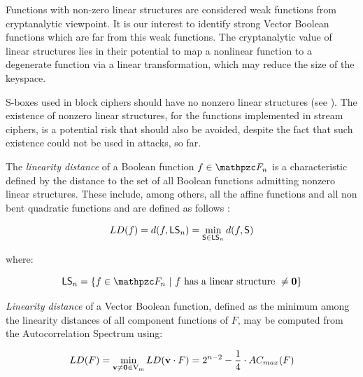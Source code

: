 Functions with non-zero linear structures are considered weak functions from cryptanalytic viewpoint. It is our interest to identify strong Vector Boolean functions which are far from this weak functions. The cryptanalytic value of linear structures lies in their potential to map a nonlinear function to a degenerate function via a linear transformation, which may reduce the size of the keyspace.

S-boxes used in block ciphers should have no nonzero linear structures (see \cite{Evertse:88}). The existence of nonzero linear structures, for the functions implemented in stream ciphers, is a potential risk that should also be avoided, despite the fact that such existence could not be used in attacks, so far.

\begin{definition}
The \textit{linearity distance} of a Boolean function $f \in \funct{F}_{n}$  is a characteristic
defined by the distance to the set of all Boolean functions admitting nonzero
linear structures. These include, among others, all the affine functions and
all non bent quadratic functions and are defined as follows \cite{MeierS:89}:

\begin{equation}
\crit{LD}(f) = d(f, \set{LS}_n) = \min_{\set{S} \in \set{LS}_n} d(f,\set{S})
\end{equation}

\end{definition}

where:

\begin{equation}
\set{LS}_n = \left\{ f \in \funct{F}_{n} \given f \mbox{ has a linear structure } \neq \vec{0} \right\}
\end{equation}

\begin{theorem}

\cite{CarletBF:08} \textit{Linearity distance} of a Vector Boolean function, defined as the minimum among the linearity
  distances of all component functions of $F$, may be computed from the Autocorrelation Spectrum using: 

\begin{equation}
\crit{LD}(F) = \min_{\vec{v} \neq \vec{0} \in \gf{V_m}} \crit{LD}(\vec{v} \cdot F) = 2^{n-2} - \frac{1}{4} \cdot \crit{AC_{max}}(F) 
\end{equation}

\end{theorem}

